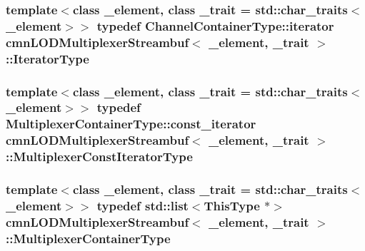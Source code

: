 \hypertarget{classcmn_l_o_d_multiplexer_streambuf_a32236d21fe0e9a13f4bea6ed743b0613}{
\subsubsection[{Iterator\-Type}]{\setlength{\rightskip}{0pt plus 5cm}template$<$class \-\_\-element, class \-\_\-trait = std\-::char\-\_\-traits$<$\-\_\-element$>$$>$ typedef Channel\-Container\-Type\-::iterator {\bf cmn\-L\-O\-D\-Multiplexer\-Streambuf}$<$ \-\_\-element, \-\_\-trait $>$\-::{\bf Iterator\-Type}}}\label{classcmn_l_o_d_multiplexer_streambuf_a32236d21fe0e9a13f4bea6ed743b0613}
\hypertarget{classcmn_l_o_d_multiplexer_streambuf_a8c5b7460b364a24c760c4acaa6d6f042}{
\subsubsection[{Multiplexer\-Const\-Iterator\-Type}]{\setlength{\rightskip}{0pt plus 5cm}template$<$class \-\_\-element, class \-\_\-trait = std\-::char\-\_\-traits$<$\-\_\-element$>$$>$ typedef Multiplexer\-Container\-Type\-::const\-\_\-iterator {\bf cmn\-L\-O\-D\-Multiplexer\-Streambuf}$<$ \-\_\-element, \-\_\-trait $>$\-::{\bf Multiplexer\-Const\-Iterator\-Type}}}\label{classcmn_l_o_d_multiplexer_streambuf_a8c5b7460b364a24c760c4acaa6d6f042}
\hypertarget{classcmn_l_o_d_multiplexer_streambuf_abddd0ebc7e720ea977f857c6350dd5a0}{
\subsubsection[{Multiplexer\-Container\-Type}]{\setlength{\rightskip}{0pt plus 5cm}template$<$class \-\_\-element, class \-\_\-trait = std\-::char\-\_\-traits$<$\-\_\-element$>$$>$ typedef std\-::list$<${\bf This\-Type} $\ast$$>$ {\bf cmn\-L\-O\-D\-Multiplexer\-Streambuf}$<$ \-\_\-element, \-\_\-trait $>$\-::{\bf Multiplexer\-Container\-Type}}}\label{classcmn_l_o_d_multiplexer_streambuf_abddd0ebc7e720ea977f857c6350dd5a0}

